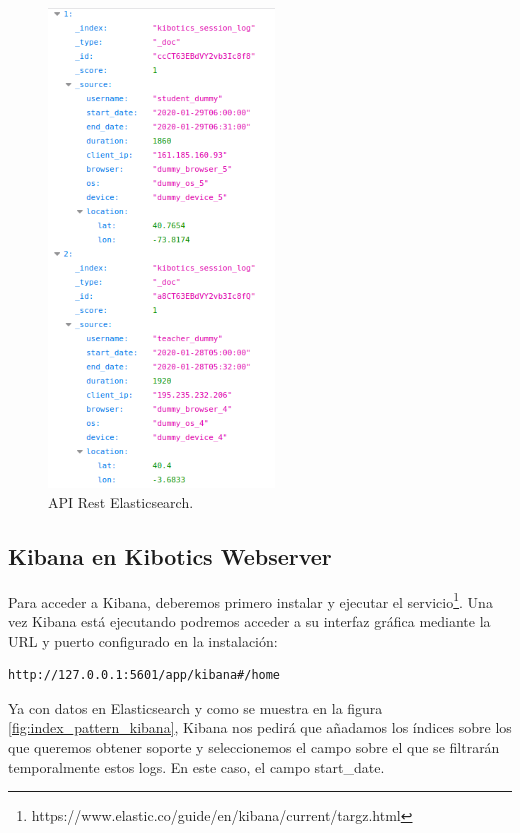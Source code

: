 \documentclass[11pt,a4paper]{book}
\begin{document}
				\begin{figure}[H]
					\centering
					\includegraphics[width=6cm, keepaspectratio]{img/api_elasticsearch.png}
					\caption{API Rest Elasticsearch.}
					\label{fig:api_elasticsearch}
				\end{figure}

			\subsection{Kibana en Kibotics Webserver}
				
				Para acceder a Kibana, deberemos primero instalar y ejecutar el servicio\footnote{https://www.elastic.co/guide/en/kibana/current/targz.html}. Una vez Kibana está ejecutando podremos acceder a su interfaz gráfica mediante la URL y puerto configurado en la instalación:
				
				\begin{Verbatim}[tabsize=4]	
http://127.0.0.1:5601/app/kibana#/home
				\end{Verbatim}
				
				Ya con datos en Elasticsearch y como se muestra en la figura \ref{fig:index_pattern_kibana}, Kibana nos pedirá que añadamos los índices sobre los que queremos obtener soporte  y seleccionemos el campo sobre el que se filtrarán temporalmente estos logs. En este caso, el campo start\_date.
\end{document}
